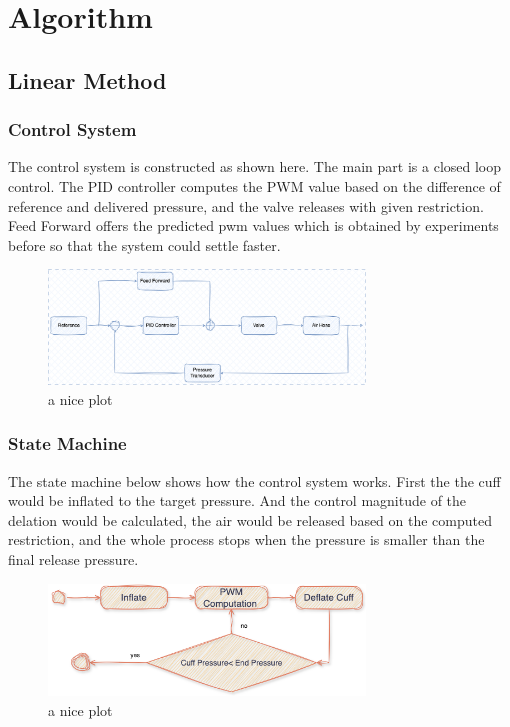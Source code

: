 \chapter{Algorithm}
\label{chap:11}

\section{Linear Method}
\subsection{Control System}
The control system is constructed as shown here. The main part is a closed loop control. The PID controller computes the PWM value based on the difference of reference and delivered pressure, and the valve releases with given restriction. Feed Forward offers the predicted pwm values which is obtained by experiments before so that the system could settle faster.

\begin{figure}[h]
    \centering 
    \captionsetup{justification=centering}
    \includegraphics[width=0.75\textwidth]{img/cs_lin.png}
    \caption{a nice plot}
    \label{fig:mesh1}
\end{figure}



\subsection{State Machine}
The state machine below shows how the control system works. First the the cuff would be inflated to the target pressure. And the control magnitude of the delation would be calculated, the air would be released based on the computed restriction, and the whole process stops when the pressure is smaller than the final release pressure.

\begin{figure}[h]
    \centering 
    \captionsetup{justification=centering}
    \includegraphics[width=0.75\textwidth]{img/st_lin.png}
    \caption{a nice plot}
    \label{fig:mesh1}
\end{figure}

